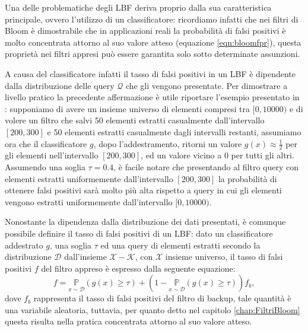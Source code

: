 \documentclass[../../main.tex]{subfiles}
\begin{document}
    
    Una delle problematiche degli LBF deriva proprio dalla sua caratteristica principale, ovvero l'utilizzo di un classificatore: ricordiamo infatti che nei filtri di Bloom è dimostrabile che in applicazioni reali la probabilità di falsi positivi è molto concentrata attorno al suo valore atteso (equazione \ref{eqn:bloomfpr}), questa proprietà nei filtri appresi può essere garantita solo sotto determinate assunzioni.

    A causa del classificatore infatti il tasso di falsi positivi in un LBF è dipendente dalla distribuzione delle query $\mathcal{Q}$ che gli vengono presentate. Per dimostrare a livello pratico la precedente affermazione è utile riportare l'esempio presentato in \cite{10.5555/3326943.3326986}: supponiamo di avere un insieme universo di elementi compresi tra $[0, 10000)$ e di volere un filtro che salvi 50 elementi estratti casualmente dall'intervallo $[200,300]$ e 50 elementi estratti casualmente dagli intervalli restanti, assumiamo ora che il classificatore $g$, dopo l'addestramento, ritorni un valore $g(x) \approx \frac{1}{2}$ per gli elementi nell'intervallo $[200,300]$, ed un valore vicino a 0 per tutti gli altri. Assumendo una soglia $\tau = 0.4$, è facile notare che presentando al filtro query con elementi estratti uniformemente dall'intervallo $[200,300]$ la probabilità di ottenere falsi positivi sarà molto più alta rispetto a query in cui gli elementi vengono estratti uniformemente dall'intervallo $[0, 10000)$.

    Nonostante la dipendenza dalla distribuzione dei dati presentati, è comunque possibile definire il tasso di falsi positivi di un LBF: dato un classificatore addestrato $g$, una soglia $\tau$ ed una query di elementi estratti secondo la distribuzione $\mathcal{D}$ dall'insieme $\mathcal{X} - \mathcal{K}$, con $\mathcal{X}$ insieme universo, il tasso di falsi positivi $f$ del filtro appreso è espresso dalla seguente equazione:
    \begin{equation}
        f = \underset{x \sim \mathcal{D}}{\mathbb{P}}(g(x) \geq \tau) + (1 - \underset{x \sim \mathcal{D}}{\mathbb{P}}(g(x) \geq \tau))f_b,
        \label{eqn:LBFFalsiPositivi}
    \end{equation} 
    dove $f_b$ rappresenta il tasso di falsi positivi del filtro di backup, tale quantità è una variabile aleatoria, tuttavia, per quanto detto nel capitolo \ref{chap:FiltriBloom} questa risulta nella pratica concentrata attorno al suo valore atteso.
\end{document}

